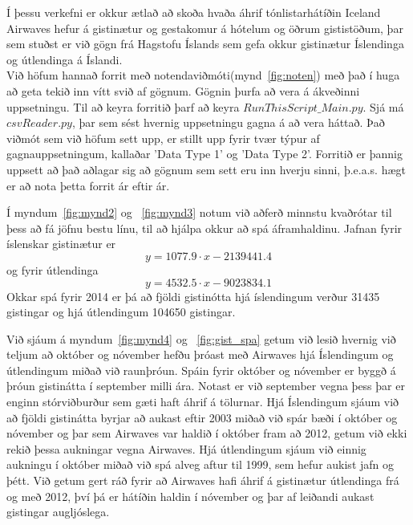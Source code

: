\documentclass[11pt,a4paper]{amsart}
\theoremstyle{plain}
\theoremstyle{definition}
\theoremstyle{remark}
\begin{document}



Í þessu verkefni er okkur ætlað að skoða hvaða áhrif tónlistarhátíðin Iceland Airwaves hefur á gistinætur og gestakomur á hótelum og öðrum gististöðum, þar sem stuðst er við gögn frá Hagstofu Íslands sem gefa okkur gistinætur Íslendinga og útlendinga á Íslandi.\\

Við höfum hannað forrit með notendaviðmóti(mynd~\ref{fig:noten}) með það í huga að geta tekið inn vítt svið af gögnum. Gögnin þurfa að vera á ákveðinni uppsetningu. Til að keyra forritið þarf að keyra $ RunThisScript\_Main.py $. Sjá má $ csvReader.py $, þar sem sést hvernig uppsetningu gagna á að vera háttað. Það viðmót sem við höfum sett upp, er stillt upp fyrir tvær týpur af gagnauppsetningum, kallaðar 'Data Type 1' og 'Data Type 2'. Forritið er þannig uppsett að það aðlagar sig að gögnum sem sett eru inn hverju sinni, þ.e.a.s. hægt er að nota þetta forrit ár eftir ár.\par

Í myndum~\ref{fig:mynd2} og ~\ref{fig:mynd3} notum við aðferð minnstu kvaðrótar til þess að fá jöfnu bestu línu, til að hjálpa okkur að spá áframhaldinu. Jafnan fyrir íslenskar gistinætur er $$ y = 1077.9 \cdot x - 2139441.4  $$ og fyrir útlendinga $$ y = 4532.5 \cdot x - 9023834.1 $$
Okkar spá fyrir 2014 er þá að fjöldi gistinótta hjá íslendingum verður 31435 gistingar og hjá útlendingum 104650 gistingar.

Við sjáum á myndum~\ref{fig:mynd4} og ~\ref{fig:gist_spa} getum við lesið hvernig við teljum að október og nóvember hefðu þróast með Airwaves hjá Íslendingum og útlendingum miðað við raunþróun. Spáin fyrir október og nóvember er byggð á þróun gistinátta í september milli ára. Notast er við september vegna þess þar er enginn stórviðburður sem gæti haft áhrif á tölurnar. Hjá Íslendingum sjáum við að fjöldi gistinátta byrjar að aukast eftir 2003 miðað við spár bæði í október og nóvember og þar sem Airwaves var haldið í október fram að 2012, getum við ekki rekið þessa aukningar vegna Airwaves. Hjá útlendingum sjáum við einnig aukningu í október miðað við spá alveg aftur til 1999, sem hefur aukist jafn og þétt. Við getum gert ráð fyrir að Airwaves hafi áhrif á gistinætur útlendinga frá og með 2012, því þá er hátíðin haldin í nóvember og þar af leiðandi aukast gistingar augljóslega.
\end{document}
